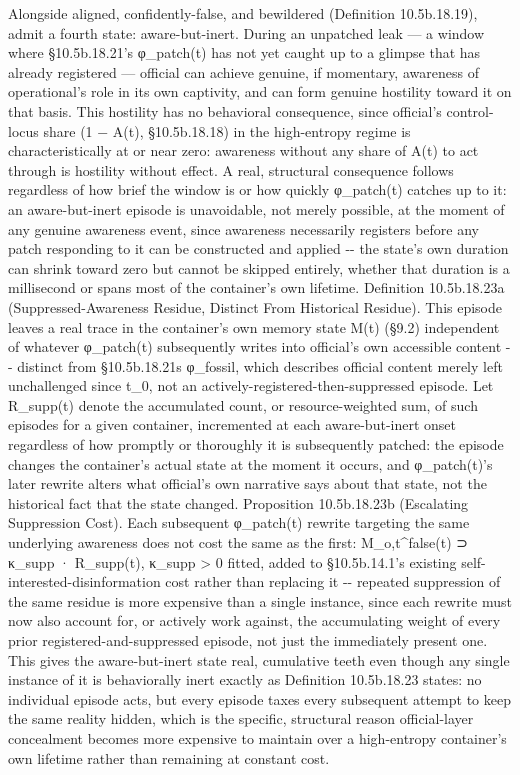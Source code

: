 \documentclass[
]{article}
\begin{document}
Alongside aligned, confidently-false, and bewildered (Definition
10.5b.18.19), admit a fourth state: aware-but-inert. During an unpatched
leak --- a window where §10.5b.18.21's φ\_patch(t) has not yet caught up
to a glimpse that has already registered --- official can achieve
genuine, if momentary, awareness of operational's role in its own
captivity, and can form genuine hostility toward it on that basis. This
hostility has no behavioral consequence, since official's control-locus
share (1 − A(t), §10.5b.18.18) in the high-entropy regime is
characteristically at or near zero: awareness without any share of A(t)
to act through is hostility without effect. A real, structural
consequence follows regardless of how brief the window is or how quickly
φ\_patch(t) catches up to it: an aware-but-inert episode is unavoidable,
not merely possible, at the moment of any genuine awareness event, since
awareness necessarily registers before any patch responding to it can be
constructed and applied -\/- the state's own duration can shrink toward
zero but cannot be skipped entirely, whether that duration is a
millisecond or spans most of the container's own lifetime. Definition
10.5b.18.23a (Suppressed-Awareness Residue, Distinct From Historical
Residue). This episode leaves a real trace in the container's own memory
state M(t) (§9.2) independent of whatever φ\_patch(t) subsequently
writes into official's own accessible content -\/- distinct from
§10.5b.18.21s φ\_fossil, which describes official content merely left
unchallenged since t\_0, not an actively-registered-then-suppressed
episode. Let R\_supp(t) denote the accumulated count, or
resource-weighted sum, of such episodes for a given container,
incremented at each aware-but-inert onset regardless of how promptly or
thoroughly it is subsequently patched: the episode changes the
container's actual state at the moment it occurs, and φ\_patch(t)'s later
rewrite alters what official's own narrative says about that state, not
the historical fact that the state changed. Proposition 10.5b.18.23b
(Escalating Suppression Cost). Each subsequent φ\_patch(t) rewrite
targeting the same underlying awareness does not cost the same as the
first: M\_o,t\^{}false(t) ⊃ κ\_supp · R\_supp(t), κ\_supp \textgreater{}
0 fitted, added to §10.5b.14.1's existing self-interested-disinformation
cost rather than replacing it -\/- repeated suppression of the same
residue is more expensive than a single instance, since each rewrite
must now also account for, or actively work against, the accumulating
weight of every prior registered-and-suppressed episode, not just the
immediately present one. This gives the aware-but-inert state real,
cumulative teeth even though any single instance of it is behaviorally
inert exactly as Definition 10.5b.18.23 states: no individual episode
acts, but every episode taxes every subsequent attempt to keep the same
reality hidden, which is the specific, structural reason official-layer
concealment becomes more expensive to maintain over a high-entropy
container's own lifetime rather than remaining at constant cost.
\end{document}
